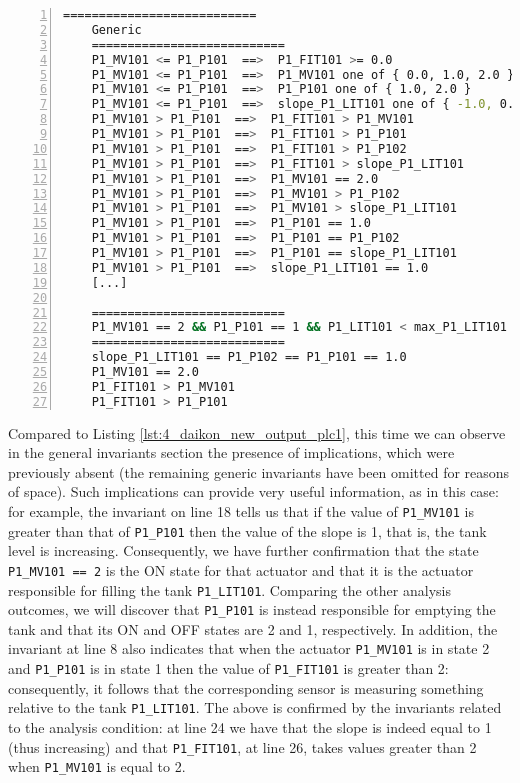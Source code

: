 \begin{lstlisting}[language=bash,numbers=left,caption={Daikon outcomes for the system configuration \texttt{P1\_MV101 == 2, P1\_P101 == 1} on \texttt{P1\_LIT101}},label=lst:4_current_system_config_analysis]
	===========================
	Generic
	===========================
	P1_MV101 <= P1_P101  ==>  P1_FIT101 >= 0.0
	P1_MV101 <= P1_P101  ==>  P1_MV101 one of { 0.0, 1.0, 2.0 }
	P1_MV101 <= P1_P101  ==>  P1_P101 one of { 1.0, 2.0 }
	P1_MV101 <= P1_P101  ==>  slope_P1_LIT101 one of { -1.0, 0.0, 1.0 }
	P1_MV101 > P1_P101  ==>  P1_FIT101 > P1_MV101
	P1_MV101 > P1_P101  ==>  P1_FIT101 > P1_P101
	P1_MV101 > P1_P101  ==>  P1_FIT101 > P1_P102
	P1_MV101 > P1_P101  ==>  P1_FIT101 > slope_P1_LIT101
	P1_MV101 > P1_P101  ==>  P1_MV101 == 2.0
	P1_MV101 > P1_P101  ==>  P1_MV101 > P1_P102
	P1_MV101 > P1_P101  ==>  P1_MV101 > slope_P1_LIT101
	P1_MV101 > P1_P101  ==>  P1_P101 == 1.0
	P1_MV101 > P1_P101  ==>  P1_P101 == P1_P102
	P1_MV101 > P1_P101  ==>  P1_P101 == slope_P1_LIT101
	P1_MV101 > P1_P101  ==>  slope_P1_LIT101 == 1.0
	[...]
	
	===========================
	P1_MV101 == 2 && P1_P101 == 1 && P1_LIT101 < max_P1_LIT101 && P1_LIT101 > min_P1_LIT101
	===========================
	slope_P1_LIT101 == P1_P102 == P1_P101 == 1.0
	P1_MV101 == 2.0
	P1_FIT101 > P1_MV101
	P1_FIT101 > P1_P101
\end{lstlisting}
Compared to Listing \ref{lst:4_daikon_new_output_plc1}, this time we can observe in the general invariants section the presence of implications, which were previously absent (the remaining generic invariants have been omitted for reasons of space). Such implications can provide very useful information, as in this case: for example, the invariant on line 18 tells us that if the value of \texttt{P1\_MV101} is greater than that of \texttt{P1\_P101} then the value of the slope is 1, that is, the tank level is increasing. Consequently, we have further confirmation that the state \texttt{P1\_MV101 == 2} is the ON state for that actuator and that it is the actuator responsible for filling the tank \texttt{P1\_LIT101}. Comparing the other analysis outcomes, we will discover that \texttt{P1\_P101} is instead responsible for emptying the tank and that its ON and OFF states are 2 and 1, respectively.\newline
In addition, the invariant at line 8 also indicates that when the actuator \texttt{P1\_MV101} is in state 2 and \texttt{P1\_P101} is in state 1 then the value of \texttt{P1\_FIT101} is greater than 2: consequently, it follows that the corresponding sensor is measuring something relative to the tank \texttt{P1\_LIT101}.\newline
The above is confirmed by the invariants related to the analysis condition: at line 24 we have that the slope is indeed equal to 1 (thus increasing) and that \texttt{P1\_FIT101}, at line 26, takes values greater than 2 when \texttt{P1\_MV101} is equal to 2.

